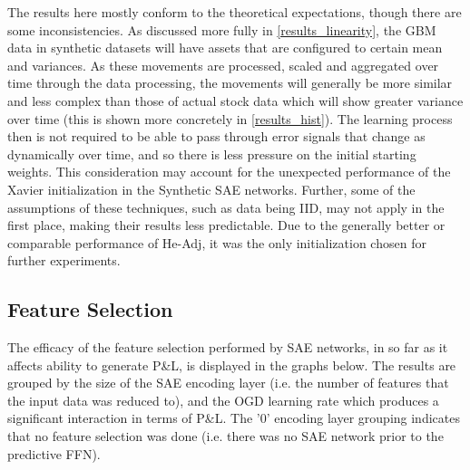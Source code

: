 \documentclass[a4paper,11pt,oneside]{article}
\theoremstyle{plain}
\theoremstyle{definition}
\begin{document}
	
	The results here mostly conform to the theoretical expectations, though there are some inconsistencies. As discussed more fully in \ref{results_linearity}, the GBM data in synthetic datasets will have assets that are configured to certain mean and variances. As these movements are processed, scaled and aggregated over time through the data processing, the movements will generally be more similar and less complex than those of actual stock data which will show greater variance over time (this is shown more concretely in \ref{results_hist}). The learning process then is not required to be able to pass through error signals that change as dynamically over time, and so there is less pressure on the initial starting weights. This consideration may account for the unexpected performance of the Xavier initialization in the Synthetic SAE networks. Further, some of the assumptions of these techniques, such as data being IID, may not apply in the first place, making their results less predictable.  Due to the generally better or comparable performance of He-Adj, it was the only initialization chosen for further experiments.  \newline
	
	
	
	
	
	\newpage
	\subsection{Feature Selection}\label{results_reduction}
	
	The efficacy of the feature selection performed by SAE networks, in so far as it affects ability to generate P\&L, is displayed in the graphs below. The results are grouped by the size of the SAE encoding layer (i.e. the number of features that the input data was reduced to), and the OGD learning rate which produces a significant interaction in terms of P\&L. The '0' encoding layer grouping indicates that no feature selection was done (i.e. there was no SAE network prior to the predictive FFN).
	
\end{document}

